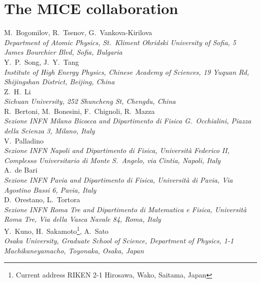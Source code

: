 %

\thispagestyle{plain}
\setlength\parindent{0em}%

\section*{The MICE collaboration}

M.~Bogomilov,  R.~Tsenov, G.~Vankova-Kirilova
\\{\it
Department of Atomic Physics, St.~Kliment Ohridski University of Sofia, 5 James Bourchier Blvd, Sofia, Bulgaria
}\\

Y.~P.~Song, J.~Y.~Tang
\\{\it
Institute of High Energy Physics, Chinese Academy of Sciences, 19 Yuquan Rd, Shijingshan District, Beijing, China
}\\

Z.~H.~Li
\\{\it
Sichuan University, 252 Shuncheng St, Chengdu, China
}\\

R.~Bertoni, M.~Bonesini, F.~Chignoli, R.~Mazza
\\{\it
Sezione INFN Milano Bicocca and Dipartimento di Fisica G.~Occhialini, Piazza della Scienza 3, Milano, Italy
}\\


V.~Palladino
\\{\it
Sezione INFN Napoli and Dipartimento di Fisica, Universit\`{a} Federico II, Complesso Universitario di Monte S.~Angelo, via Cintia, Napoli, Italy
}\\

A.~de Bari
\\{\it 
Sezione INFN Pavia and Dipartimento di Fisica, Universit\`{a} di Pavia, Via Agostino Bassi 6, Pavia, Italy
}\\

D.~Orestano, L.~Tortora
\\{\it
Sezione INFN Roma Tre and Dipartimento di Matematica e Fisica, Universit\`{a} Roma Tre, Via della Vasca Navale 84, Roma, Italy
}\\

Y.~Kuno, H.~Sakamoto\footnote{Current address RIKEN 2-1 Hirosawa, Wako, Saitama, Japan}, A.~Sato
\\{\it
Osaka University, Graduate School of Science, Department of Physics, 1-1 Machikaneyamacho, Toyonaka, Osaka, Japan
}\\

